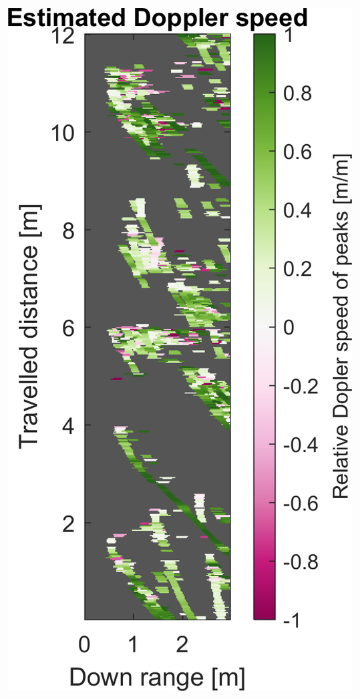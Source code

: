 \begin{figure}[htbp]
\begin{subfigure}[t]{0.475\linewidth}
    \end{subfigure}%
    \hfill%
    \begin{subfigure}[t]{0.475\linewidth}
        \centering
        \includegraphics[width=\linewidth,max height=.475\textheight]{gfx/results/indoorswimmingpool_doppler.png}

\end{subfigure}
\end{figure}
